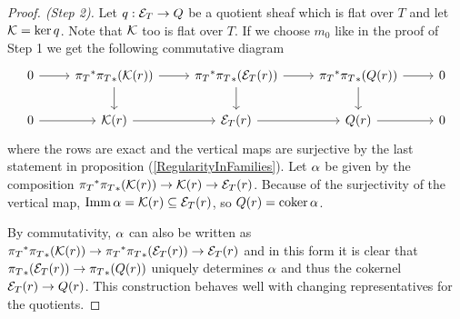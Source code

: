 \begin{proof}[Proof. (Step 2)]
Let $q:\mathcal{E}_T\to Q$ be a quotient sheaf which is flat over $T$ and let $\mathcal{K}=\ker q$. Note that $\mathcal{K}$ too is flat over $T$. If we choose $m_0$ like in the proof of Step 1 we get the following commutative diagram
\[\begin{tikzcd}
	0 & {{\pi_T}^\ast{\pi_T}_\ast(\Kc(r))} & {{\pi_T}^\ast{\pi_T}_\ast(\Ec_T(r))} & {{\pi_T}^\ast{\pi_T}_\ast(Q(r))} & 0 \\
	0 & {\Kc(r)} & {\Ec_T(r)} & {Q(r)} & 0
	\arrow[from=1-1, to=1-2]
	\arrow[from=1-2, to=1-3]
	\arrow[from=1-2, to=2-2]
	\arrow[from=1-3, to=1-4]
	\arrow[from=1-3, to=2-3]
	\arrow[from=1-4, to=1-5]
	\arrow[from=1-4, to=2-4]
	\arrow[from=2-1, to=2-2]
	\arrow[from=2-2, to=2-3]
	\arrow[from=2-3, to=2-4]
	\arrow[from=2-4, to=2-5]
\end{tikzcd}\]
where the rows are exact and the vertical maps are surjective by the last statement in proposition (\ref{RegularityInFamilies}). Let $\alpha$ be given by the composition ${\pi_T}^\ast{\pi_T}_\ast(\mathcal{K}(r))\to \mathcal{K}(r)\to \mathcal{E}_T(r)$. Because of the surjectivity of the vertical map, $\mathrm{Imm}\,\alpha=\mathcal{K}(r)\subseteq \mathcal{E}_T(r)$, so $Q(r)=\mathrm{coker}\,\alpha$.

By commutativity, $\alpha$ can also be written as ${\pi_T}^\ast{\pi_T}_\ast(\mathcal{K}(r))\to {\pi_T}^\ast{\pi_T}_\ast(\mathcal{E}_T(r))\to \mathcal{E}_T(r)$ and in this form it is clear that ${\pi_T}_\ast(\mathcal{E}_T(r))\to {\pi_T}_\ast(Q(r))$ uniquely determines $\alpha$ and thus the cokernel $\mathcal{E}_T(r)\to Q(r)$. This construction behaves well with changing representatives for the quotients.
\end{proof}

